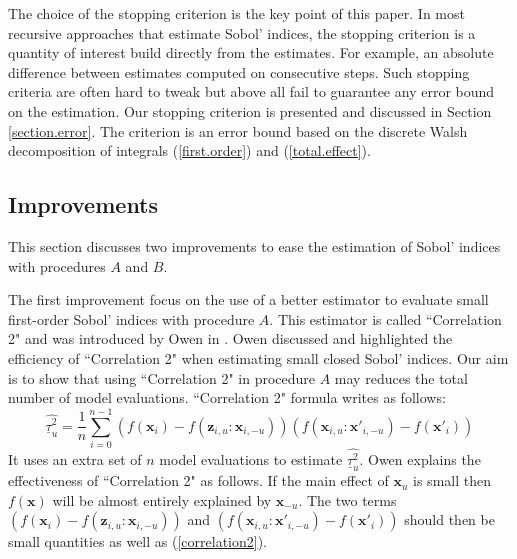 \documentclass[]{elsarticle}
\theoremstyle{definition}
\newcommand{\bvec}[1]{\boldsymbol{#1}}
\newcommand{\vx}{\bvec{x}}
\newcommand{\vz}{\bvec{z}}
\begin{document}
The choice of the stopping criterion is the key point of this paper. In most recursive approaches that estimate Sobol' indices, the stopping criterion is a quantity of interest build directly from the estimates. For example, an absolute difference between estimates computed on consecutive steps. Such stopping criteria are often hard to tweak but above all fail to guarantee any error bound on the estimation. Our stopping criterion is presented and discussed in Section \ref{section.error}. The criterion is an error bound based on the discrete Walsh decomposition of integrals (\ref{first.order}) and (\ref{total.effect}). 

\subsection{Improvements}
This section discusses two improvements to ease the estimation of Sobol' indices with procedures $A$ and $B$. 

\bigskip

The first improvement focus on the use of a better estimator to evaluate small first-order Sobol' indices with procedure $A$. This estimator is called ``Correlation 2" and was introduced by Owen in \cite{Owen}. Owen discussed and highlighted the efficiency of ``Correlation 2" when estimating small closed Sobol' indices. Our aim is to show that using ``Correlation 2" in procedure $A$ may reduces the total number of model evaluations. ``Correlation 2" formula writes as follows:
\begin{equation}
\widehat{\underline{\tau}_u^2} = \frac{1}{n} \sum \limits_{i=0}^{n-1} (f(\vx_i)-f({\vz}_{i,u}:{\vx}_{i,-u}))(f(\vx_{i,u}:{\vx'}_{i,-u})-f({\vx'}_i))
\label{correlation2}
\end{equation}
It uses an extra set of $n$ model evaluations to estimate $\widehat{\underline{\tau}_u^2}$. Owen explains the effectiveness of ``Correlation 2" as follows. If the main effect of $\vx_u$ is small then $f(\vx)$ will be almost entirely explained by $\vx_{-u}$. The two terms $(f(\vx_i)-f({\vz}_{i,u}:{\vx}_{i,-u}))$ and $(f(\vx_{i,u}:{\vx'}_{i,-u})-f({\vx'}_i))$ should then be small quantities as well as (\ref{correlation2}). 
\end{document}
